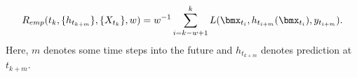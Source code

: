 \begin{equation}
\label{eq:prequentialRisk3}
R_{emp}(t_k, \{h_{t_{k+m}}\}, \{X_{t_k}\}, w) = w^{-1} \sum_{i=k - w +1}^k L(\bmx_{t_i} , h_{t_{i+m}}(\bmx_{t_i} ), y_{t_{i+m}}).
\end{equation}
Here, $m$ denotes some time steps into the future and $h_{t_{k+m}}$ denotes prediction at $t_{k+m}$.


%
%
%
%





 

%

